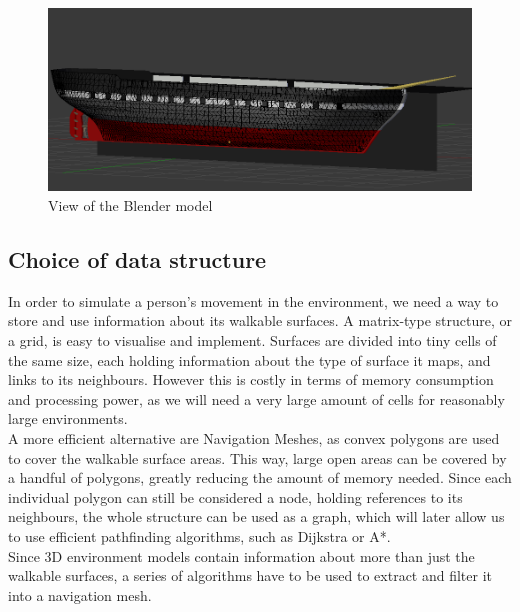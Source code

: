 \begin{figure}[H]
	\centering
	\includegraphics[width=1\textwidth]{../images/wireframe.png}
	\caption{View of the Blender model}
\end{figure}

\subsection {Choice of data structure}
In order to simulate a person's movement in the environment, we need a way to store and use information about its walkable surfaces.
A matrix-type structure, or a grid, is easy to visualise and implement. Surfaces are divided into tiny cells of the same size, each holding information about the type of surface it maps, and links to its neighbours. However this is costly in terms of memory consumption and processing power, as we will need a very large amount of cells for reasonably large environments.\\
A more efficient alternative are Navigation Meshes, as convex polygons are used to cover the walkable surface areas. This way, large open areas can be covered by a handful of polygons, greatly reducing the amount of memory needed. Since each individual polygon can still be considered a node, holding references to its neighbours, the whole structure can be used as a graph, which will later allow us to use efficient pathfinding algorithms, such as Dijkstra or A*.\\
Since 3D environment models contain information about more than just the walkable surfaces, a series of algorithms have to be used to extract and filter it into a navigation mesh.


